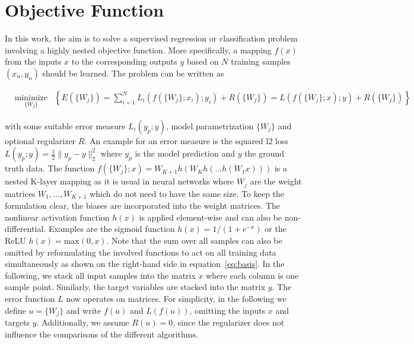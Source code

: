 \documentclass[english,11pt,a4paper]{article}
\begin{document}

\section{Objective Function}

In this work, the aim is to solve a supervised regression or classification problem involving a highly nested objective function. More specifically, a mapping $f(x)$ from the inputs $x$ to the corresponding outputs $y$ based on $N$ training samples $(x_n, y_n)$ should be learned. The problem can be written as

\begin{equation}
	\begin{aligned}
		& \underset{\{W_j\}}{\text{minimize}}
		& \left\{ E(\{W_j\}) = \sum_{i=1}^{N} L_i(f(\{W_j\};x_i);y_i) + R(\{W_j\})
		= L(f(\{W_j\};x);y) + R(\{W_j\}) \right\}
	\end{aligned}
	\label{eq:basis}
\end{equation}

with some suitable error measure $L_i(y_p;y)$, model parametrization $\{W_j\}$ and optional regularizer $R$. An example for an error measure is the squared l2 loss $L(y_p;y) = \frac{1}{2} \| y_p - y \|^2_2$ where $y_p$ is the model prediction and $y$ the ground truth data. The function $f(\{W_j\};x) = W_{K+1}h(W_Kh(\dots h(W_1x)))$ is a nested K-layer mapping as it is usual in neural networks where $W_j$ are the weight matrices $W_1,\dots,W_{K+1}$ which do not need to have the same size. To keep the formulation clear, the biases are incorporated into the weight matrices. The nonlinear activation function $h(x)$ is applied element-wise and can also be non-differential. Examples are the sigmoid function $h(x) = 1/(1 + e^{-x})$ or the ReLU $h(x) = \mathrm{max}(0, x)$. Note that the sum over all samples can also be omitted by reformulating the involved functions to act on all training data simultaneously as shown on the right-hand side in equation~\ref{eq:basis}. In the following, we stack all input samples into the matrix $x$ where each column is one sample point. Similarly, the target variables are stacked into the matrix $y$. The error function $L$ now operates on matrices. For simplicity, in the following we define $u = \{W_j\}$ and write $f(u)$ and $L(f(u))$, omitting the inputs $x$ and targets $y$. Additionally, we assume $R(u) = 0$, since the regularizer does not influence the comparisons of the different algorithms.
\end{document}
